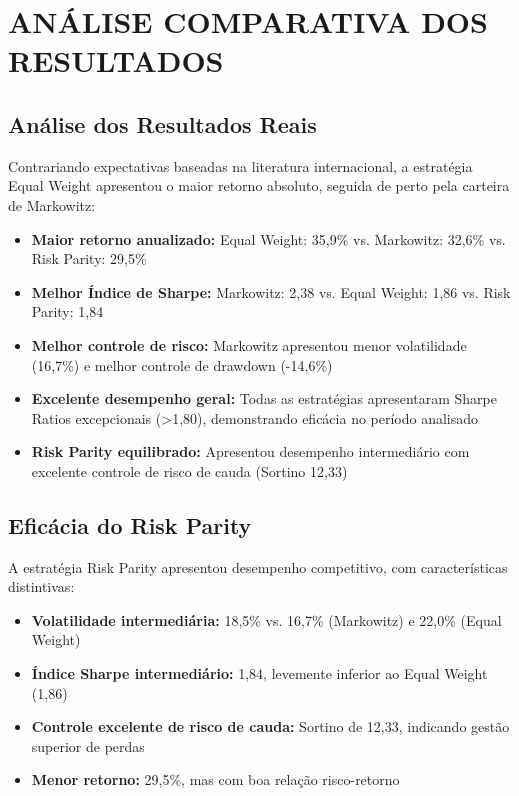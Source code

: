 \section{ANÁLISE COMPARATIVA DOS RESULTADOS}

\subsection{Análise dos Resultados Reais}

Contrariando expectativas baseadas na literatura internacional, a estratégia Equal Weight apresentou o maior retorno absoluto, seguida de perto pela carteira de Markowitz:

\begin{itemize}
    \item \textbf{Maior retorno anualizado:} Equal Weight: 35,9\% vs. Markowitz: 32,6\% vs. Risk Parity: 29,5\%
    \item \textbf{Melhor Índice de Sharpe:} Markowitz: 2,38 vs. Equal Weight: 1,86 vs. Risk Parity: 1,84
    \item \textbf{Melhor controle de risco:} Markowitz apresentou menor volatilidade (16,7\%) e melhor controle de drawdown (-14,6\%)
    \item \textbf{Excelente desempenho geral:} Todas as estratégias apresentaram Sharpe Ratios excepcionais (>1,80), demonstrando eficácia no período analisado
    \item \textbf{Risk Parity equilibrado:} Apresentou desempenho intermediário com excelente controle de risco de cauda (Sortino 12,33)
\end{itemize}

\subsection{Eficácia do Risk Parity}

A estratégia Risk Parity apresentou desempenho competitivo, com características distintivas:

\begin{itemize}
    \item \textbf{Volatilidade intermediária:} 18,5\% vs. 16,7\% (Markowitz) e 22,0\% (Equal Weight)
    \item \textbf{Índice Sharpe intermediário:} 1,84, levemente inferior ao Equal Weight (1,86)
    \item \textbf{Controle excelente de risco de cauda:} Sortino de 12,33, indicando gestão superior de perdas
    \item \textbf{Menor retorno:} 29,5\%, mas com boa relação risco-retorno
\end{itemize}

